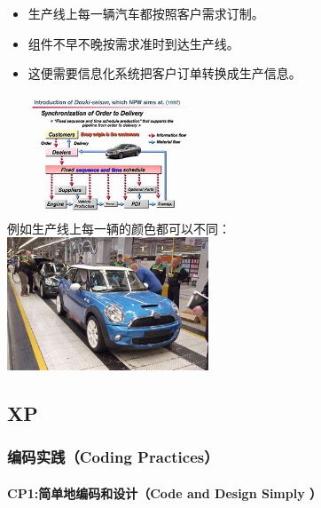 \begin{itemize}
\tightlist
\item
  生产线上每一辆汽车都按照客户需求订制。
\item
  组件不早不晚按需求准时到达生产线。
\item
  这便需要信息化系统把客户订单转换成生产信息。
\end{itemize}

\includegraphics[width=6cm]{NissanJIT_OIPRQGKy67DWGTu-DQiOCqW2gHaEK.jpg}\\

例如生产线上每一辆的颜色都可以不同：\\
\includegraphics[width=6cm]{NissanProdLineOIPwJFmfMl7q2_V8JaQi4kQ8QHaE6.jpg}\\

\hypertarget{xp}{%
\subsection{XP}\label{xp}}

\hypertarget{ux7f16ux7801ux5b9eux8df5coding-practices}{%
\subsubsection{编码实践（Coding
Practices）}\label{ux7f16ux7801ux5b9eux8df5coding-practices}}

\hypertarget{cp1ux7b80ux5355ux5730ux7f16ux7801ux548cux8bbeux8ba1code-and-design-simply}{%
\paragraph{CP1:简单地编码和设计（Code and Design Simply
）}\label{cp1ux7b80ux5355ux5730ux7f16ux7801ux548cux8bbeux8ba1code-and-design-simply}}

